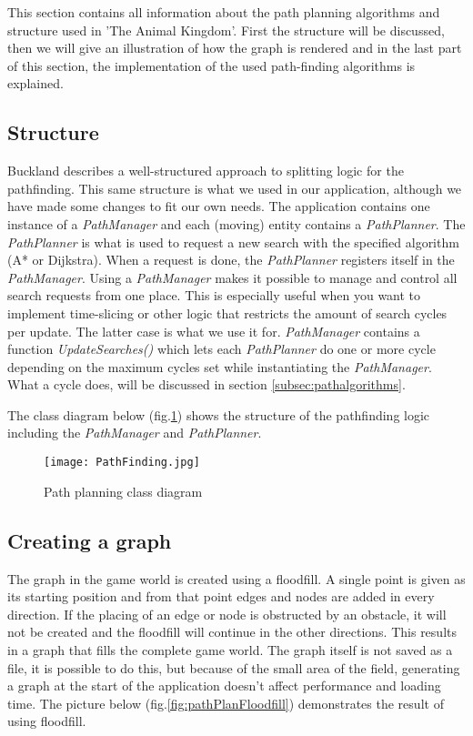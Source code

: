 This section contains all information about the path planning algorithms and structure used in 'The Animal Kingdom'.
First the structure will be discussed, then we will give an illustration of how the graph is rendered and in the last part of this section,
the implementation of the used path-finding algorithms is explained.

\subsection{Structure}\label{subsec:pathstructure}
Buckland\cite{pgaie} describes a well-structured approach to splitting logic for the pathfinding.
This same structure is what we used in our application, although we have made some changes to fit our own needs.
The application contains one instance of a \textit{PathManager} and each (moving) entity contains a \textit{PathPlanner}.
The \textit{PathPlanner} is what is used to request a new search with the specified algorithm (A* or Dijkstra).
When a request is done, the \textit{PathPlanner} registers itself in the \textit{PathManager}.
Using a \textit{PathManager} makes it possible to manage and control all search requests from one place.
This is especially useful when you want to implement time-slicing or other logic that restricts the amount of search cycles per update.
The latter case is what we use it for.
\textit{PathManager} contains a function \textit{UpdateSearches()} which lets each \textit{PathPlanner} do one or more cycle depending on the maximum cycles set while instantiating the \textit{PathManager}.
What a cycle does, will be discussed in section \ref{subsec:pathalgorithms}.\par
The class diagram below (fig.\ref{fig:pathPlanClassDiagram}) shows the structure of the pathfinding logic including the \textit{PathManager} and \textit{PathPlanner}.

\begin{figure}[h!]
    \begin{center}
        \texttt{[image: PathFinding.jpg]}
    \end{center}
    \caption{Path planning class diagram}
    \label{fig:pathPlanClassDiagram}
\end{figure}

\subsection{Creating a graph}\label{subsec:pathgraphcreation}
The graph in the game world is created using a floodfill.
A single point is given as its starting position and from that point edges and nodes are added in every direction.
If the placing of an edge or node is obstructed by an obstacle, it will not be created and the floodfill will continue
in the other directions.
This results in a graph that fills the complete game world.
The graph itself is not saved as a file, it is possible to do this, but because of the small area of the field,
generating a graph at the start of the application doesn't affect performance and loading time.
The picture below (fig.\ref{fig:pathPlanFloodfill}) demonstrates the result of using floodfill.

